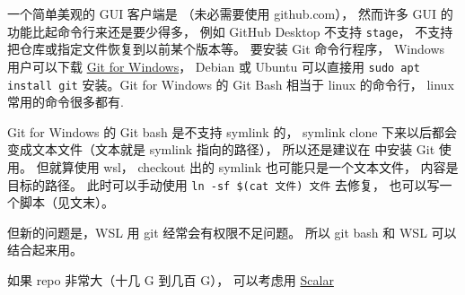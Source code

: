 

一个简单美观的 GUI 客户端是 （未必需要使用 github.com）， 然而许多 GUI 的功能比起命令行来还是要少得多， 例如 GitHub Desktop 不支持 \verb`stage`， 不支持把仓库或指定文件恢复到以前某个版本等。 要安装 Git 命令行程序， Windows 用户可以下载 \href{https://gitforwindows.org/}{Git for Windows}， Debian 或 Ubuntu 可以直接用 \verb`sudo apt install git` 安装。Git for Windows 的 Git Bash 相当于 linux 的命令行， linux 常用的命令很多都有.

Git for Windows 的 Git bash 是不支持 symlink 的， symlink clone 下来以后都会变成文本文件（文本就是 symlink 指向的路径）， 所以还是建议在  中安装 Git 使用。 但就算使用 wsl， checkout 出的 symlink 也可能只是一个文本文件， 内容是目标的路径。 此时可以手动使用 \verb`ln -sf $(cat 文件) 文件` 去修复， 也可以写一个脚本（见文末）。

但新的问题是，WSL 用 git 经常会有权限不足问题。 所以 git bash 和 WSL 可以结合起来用。

如果 repo 非常大（十几 G 到几百 G）， 可以考虑用 \href{https://git-scm.com/docs/scalar}{Scalar}

